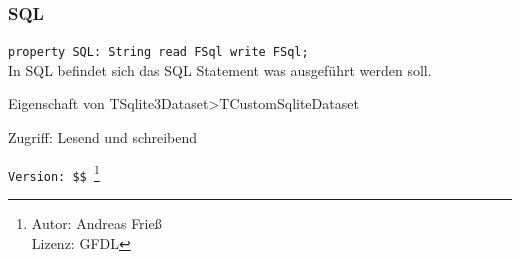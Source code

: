 \subsubsection{SQL}
\begin{description}
  \item \texttt{property SQL: String read FSql write FSql;}\\In SQL befindet sich das SQL Statement was ausgeführt werden soll.
  \begin{description}
    \item Eigenschaft von TSqlite3Dataset>TCustomSqliteDataset
  \end{description}
  \begin{description}
    \item Zugriff: Lesend und schreibend
  \end{description}
\end{description}

\verb|Version: $$ |\footnote{ Autor: Andreas Frieß\\Lizenz: GFDL}